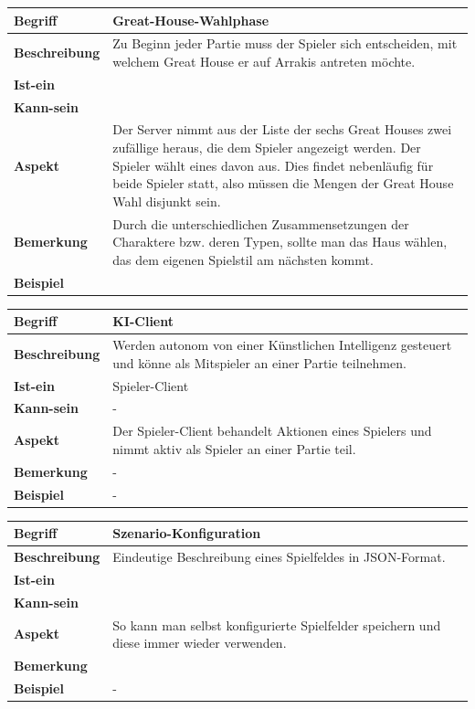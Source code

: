 \documentclass{uulm-assignment}
\begin{document}
\begin{tabularx}{16cm}{|l|X|}
\hline
\textbf{Begriff} & \textbf{Great-House-Wahlphase} \\
\hline
\textbf{Beschreibung} & Zu Beginn jeder Partie muss der Spieler sich entscheiden, mit welchem Great House er auf Arrakis antreten möchte. \\
\hline
\textbf{Ist-ein} & \\
\hline
\textbf{Kann-sein} & \\
\hline
\textbf{Aspekt} & Der Server nimmt aus der Liste der sechs Great Houses zwei zufällige heraus, die dem Spieler angezeigt werden. Der Spieler wählt eines davon aus. Dies findet nebenläufig für beide Spieler statt, also müssen die Mengen der Great House Wahl disjunkt sein.\\
\hline
\textbf{Bemerkung} & Durch die unterschiedlichen Zusammensetzungen der Charaktere bzw. deren Typen, sollte man das Haus wählen, das dem eigenen Spielstil am nächsten kommt. \\
\hline
\textbf{Beispiel} &  \\
\hline
\end{tabularx}

\begin{tabularx}{16cm}{|l|X|}
\hline
\textbf{Begriff} & \textbf{KI-Client} \\
\hline
\textbf{Beschreibung} & Werden autonom von einer Künstlichen Intelligenz gesteuert und könne als Mitspieler an einer Partie teilnehmen. \\
\hline
\textbf{Ist-ein} & Spieler-Client \\
\hline
\textbf{Kann-sein} & - \\
\hline
\textbf{Aspekt} & Der Spieler-Client behandelt Aktionen eines Spielers und nimmt aktiv als Spieler an einer Partie teil. \\
\hline
\textbf{Bemerkung} & - \\
\hline
\textbf{Beispiel} & - \\
\hline
\end{tabularx}

\begin{tabularx}{16cm}{|l|X|}
\hline
\textbf{Begriff} & \textbf{Szenario-Konfiguration } \\
\hline
\textbf{Beschreibung} & Eindeutige Beschreibung eines Spielfeldes in JSON-Format. \\
\hline
\textbf{Ist-ein} & \\
\hline
\textbf{Kann-sein} & \\
\hline
\textbf{Aspekt} & So kann man selbst konfigurierte Spielfelder speichern und diese immer wieder verwenden.\\
\hline
\textbf{Bemerkung} &  \\
\hline
\textbf{Beispiel} & - \\
\hline
\end{tabularx}
\end{document}
